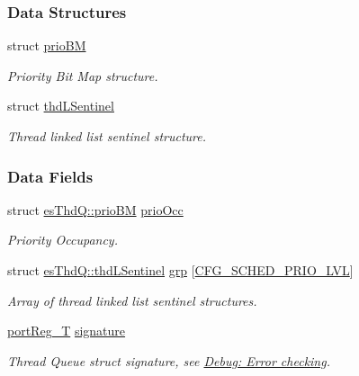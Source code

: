 \subsubsection*{Data Structures}
\begin{DoxyCompactItemize}
\item 
struct \hyperlink{structesThdQ_1_1prioBM}{prio\-B\-M}
\begin{DoxyCompactList}\small\item\em Priority Bit Map structure. \end{DoxyCompactList}\item 
struct \hyperlink{structesThdQ_1_1thdLSentinel}{thd\-L\-Sentinel}
\begin{DoxyCompactList}\small\item\em Thread linked list sentinel structure. \end{DoxyCompactList}\end{DoxyCompactItemize}
\subsubsection*{Data Fields}
\begin{DoxyCompactItemize}
\item 
struct \hyperlink{structesThdQ_1_1prioBM}{es\-Thd\-Q\-::prio\-B\-M} \hyperlink{structesThdQ_a27c44ea3949929a9790429f80e0416ff}{prio\-Occ}
\begin{DoxyCompactList}\small\item\em Priority Occupancy. \end{DoxyCompactList}\item 
struct \hyperlink{structesThdQ_1_1thdLSentinel}{es\-Thd\-Q\-::thd\-L\-Sentinel} \hyperlink{structesThdQ_ab5c8c18bb5c015f16ae51bba644a05f5}{grp} \mbox{[}\hyperlink{group__template__kern__cfg_ga56bd89fe76f7fe22f3d8805bc3c68892}{C\-F\-G\-\_\-\-S\-C\-H\-E\-D\-\_\-\-P\-R\-I\-O\-\_\-\-L\-V\-L}\mbox{]}
\begin{DoxyCompactList}\small\item\em Array of thread linked list sentinel structures. \end{DoxyCompactList}\item 
\hyperlink{group__template__cpu__intf_ga99980ab56ce9857e7380210d12e3d41f}{port\-Reg\-\_\-\-T} \hyperlink{structesThdQ_a2756407c94319267cbf5d30814182b4d}{signature}
\begin{DoxyCompactList}\small\item\em Thread Queue struct signature, see \hyperlink{errors}{Debug\-: Error checking}. \end{DoxyCompactList}\end{DoxyCompactItemize}


